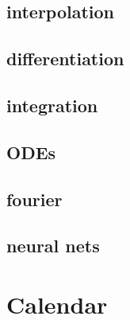 \documentclass[12pt,letterpaper]{article}
\begin{document}
\subsection{interpolation}

\subsection{differentiation}
\subsection{integration}
\subsection{ODEs}
\subsection{fourier}
\subsection{neural nets}

\section{Calendar}




\end{document}
